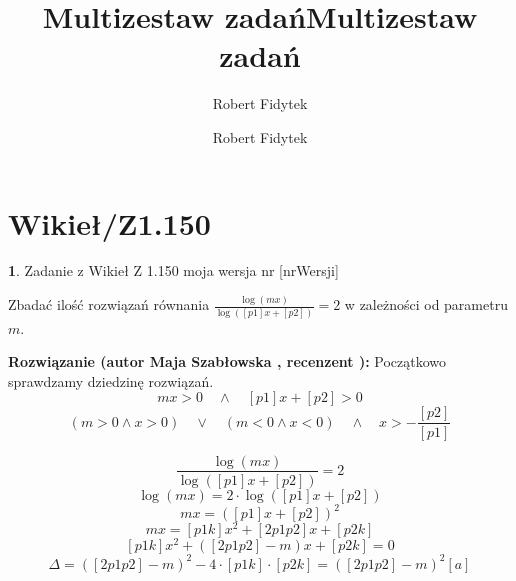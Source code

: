 \documentclass[12pt, a4paper]{article}
\title{Multizestaw zadań}
\author{Robert Fidytek}
\date{}\documentclass[12pt, a4paper]{article}
\title{Multizestaw zadań}
\author{Robert Fidytek}
\date{}
\theoremstyle{definition} %
\newtheorem{zad}{}
\theoremstyle{definition} %
\newtheorem{zad}{}
\newcommand{\kategoria}[1]{\section{#1}} %
\newcommand{\zadStart}[1]{\begin{zad}#1\newline} %
\newcommand{\zadStop}{\end{zad}}   %
\newcommand{\rozwStart}[2]{\noindent \textbf{Rozwiązanie (autor #1 , recenzent #2): }\newline} %
\begin{document}
\maketitle


\kategoria{Wikieł/Z1.150}
\zadStart{Zadanie z Wikieł Z 1.150  moja wersja nr [nrWersji]}


Zbadać ilość rozwiązań równania $\frac{\log(mx)}{\log([p1]x+[p2])}=2 $ w zależności od parametru $m$.
\zadStop

\rozwStart{Maja Szabłowska}{}
Początkowo sprawdzamy dziedzinę rozwiązań.
$$mx>0 \quad \land \quad [p1]x+[p2]>0$$
$$(m>0 \land x>0) \quad \lor \quad  (m<0 \land x<0) \quad \land \quad x>-\frac{[p2]}{[p1]}$$

$$\frac{\log(mx)}{\log([p1]x+[p2])}=2 $$
$$\log(mx)=2\cdot \log([p1]x+[p2])$$
$$mx=([p1]x+[p2])^{2}$$
$$mx=[p1k]x^{2}+[2p1p2]x+[p2k]$$
$$[p1k]x^{2}+([2p1p2]-m)x+[p2k]=0$$
$$\Delta=([2p1p2]-m)^{2}-4\cdot[p1k]\cdot[p2k]=([2p1p2]-m)^{2}[a]$$
\end{document}
